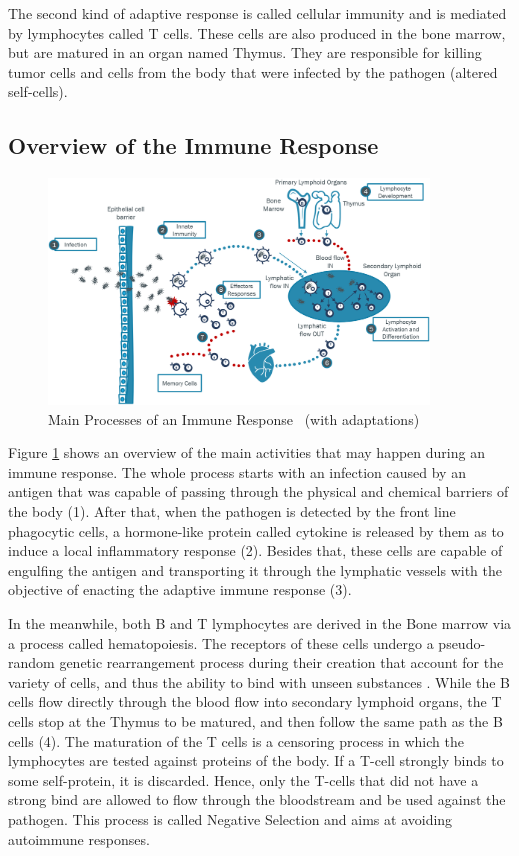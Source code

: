 The second kind of adaptive response is called cellular immunity and is mediated by lymphocytes called T cells. These cells are also produced in the bone marrow, but are matured in an organ named Thymus. They are responsible for killing tumor cells and cells from the body that were infected by the pathogen (altered self-cells).

\subsection{Overview of the Immune Response}

\begin{figure}[!h]
	\centering
	\includegraphics[width=0.9\textwidth, keepaspectratio]{img/overview_bis.png}
	\caption{Main Processes of an Immune Response~\cite{Kuby2019} (with adaptations)}
	\label{fig:BISOverview}
\end{figure}

Figure \ref{fig:BISOverview} shows an overview of the main activities that may happen during an immune response. The whole process starts with an infection caused by an antigen that was capable of passing through the physical and chemical barriers of the body (1). After that, when the pathogen is detected by the front line phagocytic cells, a hormone-like protein called cytokine is released by them as to induce a local inflammatory response (2). Besides that, these cells are capable of engulfing the antigen and transporting it through the lymphatic vessels with the objective of enacting the adaptive immune response (3).

In the meanwhile, both B and T lymphocytes are derived in the Bone marrow via a process called hematopoiesis. The receptors of these cells undergo a pseudo-random genetic rearrangement process during their creation that account for the variety of cells, and thus the ability to bind with unseen substances \cite{AIS2014}. While the B cells flow directly through the blood flow into secondary lymphoid organs, the T cells stop at the Thymus to be matured, and then follow the same path as the B cells (4). The maturation of the T cells is a censoring process in which the lymphocytes are tested against proteins of the body. If a T-cell strongly binds to some self-protein, it is discarded. Hence, only the T-cells that did not have a strong bind are allowed to flow through the bloodstream and be used against the pathogen. This process is called Negative Selection and aims at avoiding autoimmune responses.

